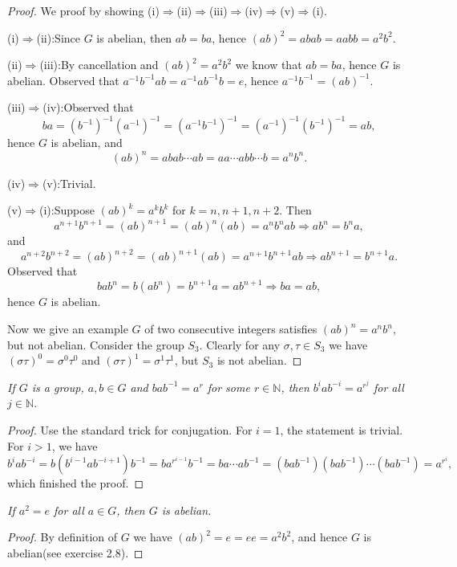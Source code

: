 \begin{proof}
We proof by showing (i)$\Rightarrow$(ii)$\Rightarrow$(iii)$\Rightarrow$(iv)$\Rightarrow$(v)$\Rightarrow$(i).\par
(i)$\Rightarrow$(ii):Since $G$ is abelian, then $ab=ba$, hence $(ab)^2=abab=aabb=a^2b^2$.\par
(ii)$\Rightarrow$(iii):By cancellation and $(ab)^2=a^2b^2$ we know that $ab=ba$, hence $G$ is abelian. Observed that $a^{-1}b^{-1}ab=a^{-1}ab^{-1}b=e$, hence $a^{-1}b^{-1}=(ab)^{-1}$.\par
(iii)$\Rightarrow$(iv):Observed that 
$$
ba=\left( b^{-1} \right) ^{-1}\left( a^{-1} \right) ^{-1}=\left( a^{-1}b^{-1} \right) ^{-1}=\left( a^{-1} \right) ^{-1}\left( b^{-1} \right) ^{-1}=ab,
$$
hence $G$ is abelian, and 
$$
\left( ab \right) ^n=abab\cdots ab=aa\cdots abb\cdots b=a^nb^n.
$$\par
(iv)$\Rightarrow$(v):Trivial.\par
(v)$\Rightarrow$(i):Suppose $(ab)^k=a^kb^k$ for $k=n,n+1,n+2$. Then
$$
a^{n+1}b^{n+1}=\left( ab \right) ^{n+1}=\left( ab \right) ^n\left( ab \right) =a^nb^nab\Rightarrow ab^n=b^na,
$$
and 
$$
a^{n+2}b^{n+2}=\left( ab \right) ^{n+2}=\left( ab \right) ^{n+1}\left( ab \right) =a^{n+1}b^{n+1}ab\Rightarrow ab^{n+1}=b^{n+1}a.
$$
Observed that 
$$
bab^n=b\left( ab^n \right) =b^{n+1}a=ab^{n+1}\Rightarrow ba=ab,
$$
hence $G$ is abelian.\par
Now we give an example $G$ of two consecutive integers satisfies $(ab)^n=a^nb^n$, but not abelian. Consider the group $S_3$. Clearly for any $\sigma,\tau\in S_3$ we have $(\sigma\tau)^0=\sigma^0\tau^0$ and $(\sigma\tau)^1=\sigma^1\tau^1$, but $S_3$ is not abelian.
\end{proof}
\begin{problem}\em
If $G$ is a group, $a,b\in G$ and $bab^{-1}=a^r$ for some $r\in\mathbb{N}$, then $b^iab^{-i}=a^{r^j}$ for all $j\in\mathbb{N}$.
\end{problem}
\begin{proof}
Use the standard trick for conjugation. For $i=1$, the statement is trivial. For $i>1$, we have
$$
b^iab^{-i}=b\left( b^{i-1}ab^{-i+1} \right) b^{-1}=ba^{r^{i-1}}b^{-1}=ba\cdots ab^{-1}=\left( bab^{-1} \right) \left( bab^{-1} \right) \cdots \left( bab^{-1} \right) =a^{r^i},
$$
which finished the proof.
\end{proof}
\begin{problem}\em
If $a^2=e$ for all $a\in G$, then $G$ is abelian.
\end{problem}
\begin{proof}
By definition of $G$ we have $(ab)^2=e=ee=a^2b^2$, and hence $G$ is abelian(see exercise 2.8).
\end{proof}
